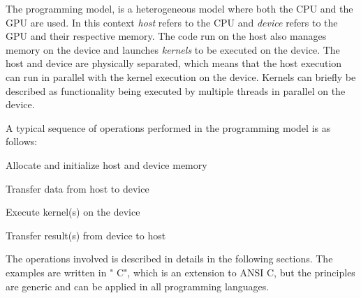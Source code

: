 The \cuda{} programming model, is a heterogeneous model where both the CPU and the GPU are used.
In this context \textit{host} refers to the CPU and \textit{device} refers to the GPU and their respective memory.
The code run on the host also manages memory on the device and launches \textit{kernels} to be executed on the device.
The host and device are physically separated, which means that the host execution can run in parallel with the kernel execution on the device.
Kernels can briefly be described as functionality being executed by multiple threads in parallel on the device.

\noindent A typical sequence of operations performed in the \cuda{} programming model is as follows:
\begin{enumerateSmall}
	\item Allocate and initialize host and device memory
	\item Transfer data from host to device
	\item Execute kernel(s) on the device
	\item Transfer result(s) from device to host
\end{enumerateSmall}
The operations involved is described in details in the following sections.
The \cuda{} examples are written in "\cuda{} C", which is an extension to ANSI C, but the principles are generic and can be applied in all \cuda{} programming languages.
